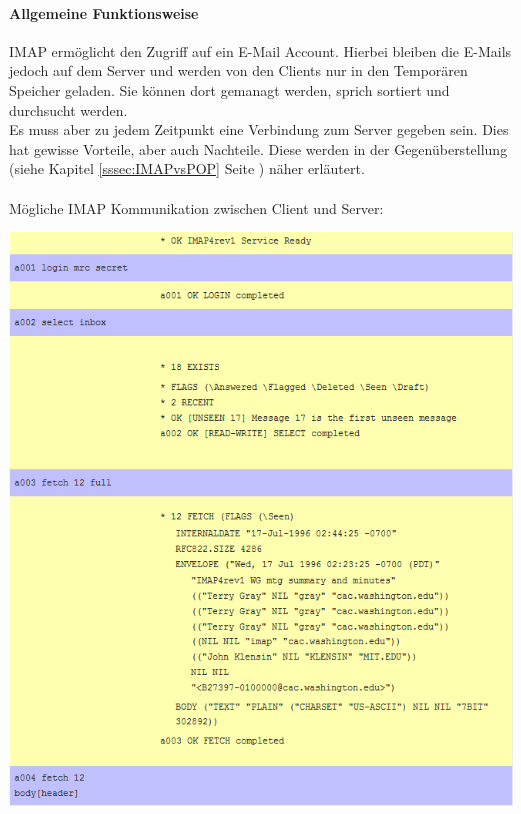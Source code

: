 \documentclass[12pt,a4paper]{report}
\begin{document}
\begin{onehalfspace}
\paragraph{Allgemeine Funktionsweise\\}
IMAP ermöglicht den Zugriff auf ein E-Mail Account. Hierbei bleiben die E-Mails jedoch auf dem Server und werden von den Clients nur in den Temporären Speicher geladen. Sie können dort gemanagt werden, sprich sortiert und durchsucht werden.\\

Es muss aber zu jedem Zeitpunkt eine Verbindung zum Server gegeben sein. Dies hat gewisse Vorteile, aber auch Nachteile. Diese werden in der Gegenüberstellung (siehe Kapitel \ref{sssec:IMAPvsPOP} Seite \pageref{sssec:IMAPvsPOP}) näher erläutert.\\\\
Mögliche IMAP Kommunikation zwischen Client und Server:\\
\begin{center}
\includegraphics[scale=0.7]{../docs/lyaton/graphics/IMAP-Kommunikation_p1.png}

\end{center}
\end{onehalfspace}
\end{document}
